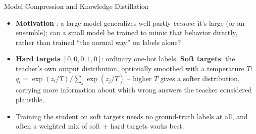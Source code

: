 \begin{vbframe}{Model Compression and Knowledge Distillation}

\vfill

\begin{itemize}
	\item \textbf{Motivation} : a large model generalizes well partly \emph{because} it's large (or an ensemble); can a small model be trained to mimic that behavior directly, rather than trained ``the normal way'' on labels alone?
	\item \textbf{Hard targets} $[0,0,0,1,0]$: ordinary one-hot labels. \textbf{Soft targets}: the teacher's own output distribution, optionally smoothed with a temperature $T$: $q_i = \exp(z_i/T) / \sum_j \exp(z_j/T)$ -- higher $T$ gives a softer distribution, carrying more information about which wrong answers the teacher considered plausible.
	\item Training the student on soft targets needs no ground-truth labels at all, and often a weighted mix of soft + hard targets works best.
\end{itemize}

\vfill

\end{vbframe}


